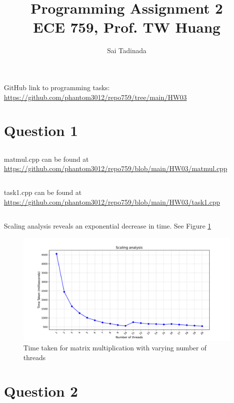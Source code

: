 \documentclass[12pt]{article}
\title{Programming Assignment 2 \\ \small{ECE 759, Prof. TW Huang}}
\author{Sai Tadinada}
\date{}
\begin{document}
\maketitle

GitHub link to programming tasks: \\ \url{https://github.com/phantom3012/repo759/tree/main/HW03}

\section{Question 1}
\subsection{}
matmul.cpp can be found at \url{https://github.com/phantom3012/repo759/blob/main/HW03/matmul.cpp}

\subsection{}
task1.cpp can be found at \url{https://github.com/phantom3012/repo759/blob/main/HW03/task1.cpp}

\subsection{}
Scaling analysis reveals an exponential decrease in time. See Figure \ref{fig:threads_change_task1}
\begin{figure}[ht]
    \includegraphics[width = \textwidth]{task1.pdf}
    \caption{Time taken for matrix multiplication with varying number of threads}
    \label{fig:threads_change_task1}
\end{figure}
\newpage

\section{Question 2}
\end{document}
